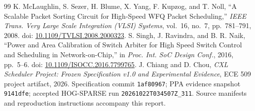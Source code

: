\documentclass[10pt,letterpaper,twocolumn]{article}
\newcommand{\code}[1]{\texttt{#1}}
\begin{document}
\begin{thebibliography}{99}
 K. McLaughlin, S. Sezer, H. Blume, X. Yang, F. Kupzog, and T. Noll, ``A Scalable Packet Sorting Circuit for High-Speed WFQ Packet Scheduling,'' \emph{IEEE Trans. Very Large Scale Integration (VLSI) Systems}, vol.~16, no.~7, pp.~781--791, 2008. doi: \href{https://doi.org/10.1109/TVLSI.2008.2000323}{10.1109/TVLSI.2008.2000323}.
 S. Singh, J. Ravindra, and B. R. Naik, ``Power and Area Calibration of Switch Arbiter for High Speed Switch Control and Scheduling in Network-on-Chip,'' in \emph{Proc. Int. SoC Design Conf.}, 2016, pp.~5--6. doi: \href{https://doi.org/10.1109/ISOCC.2016.7799765}{10.1109/ISOCC.2016.7799765}.
 J. Chiang and D. Chou, \emph{CXL Scheduler Project: Frozen Specification v1.0 and Experimental Evidence}, ECE 509 project artifact, 2026. Specification commit \code{1af80967}; PPA evidence snapshot \code{9141dfe}; accepted HOG-SPARSE run \code{20261022T034507Z\_311}. Source manifests and reproduction instructions accompany this report.
\end{thebibliography}
\endgroup
\end{document}
